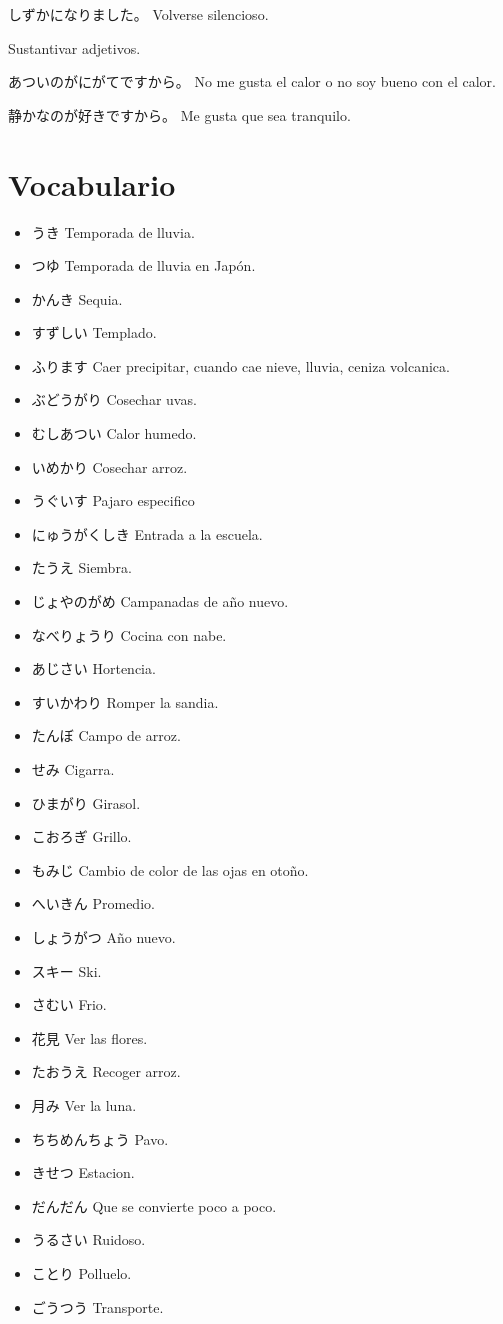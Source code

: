 \documentclass[a4paper,lualatex,ja=standard,base=10pt]{bxjsarticle}
\begin{document}
しずかになりました。 Volverse silencioso.


Sustantivar adjetivos.

あついのがにがてですから。 No me gusta el calor o no soy bueno con el calor.

静かなのが好きですから。 Me gusta que sea tranquilo.

\section{Vocabulario}
\medskip

\begin{itemize}
  \item うき Temporada de lluvia.
  \item つゆ Temporada de lluvia en Japón.
  \item かんき Sequia.
  \item すずしい Templado.
  \item ふります Caer precipitar, cuando cae nieve, lluvia, ceniza volcanica.
  \item ぶどうがり Cosechar uvas.
  \item むしあつい Calor humedo.
  \item いめかり Cosechar arroz.
  \item うぐいす Pajaro especifico
  \item にゅうがくしき Entrada a la escuela.
  \item たうえ Siembra.
  \item じょやのがめ Campanadas de año nuevo.
  \item なべりょうり Cocina con nabe.
  \item あじさい Hortencia.
  \item すいかわり Romper la sandia.
  \item たんぼ Campo de arroz.
  \item せみ Cigarra.
  \item ひまがり Girasol.
  \item こおろぎ Grillo.
  \item もみじ Cambio de color de las ojas en otoño.
  \item へいきん Promedio.
  \item しょうがつ Año nuevo.
  \item スキー Ski.
  \item さむい Frio.
  \item 花見 Ver las flores.
  \item たおうえ Recoger arroz.
  \item 月み Ver la luna.
  \item ちちめんちょう Pavo.
  \item きせつ Estacion.
  \item だんだん Que se convierte poco a poco.
  \item うるさい Ruidoso.
  \item ことり Polluelo.
  \item ごうつう Transporte.


\end{itemize}
\end{document}
